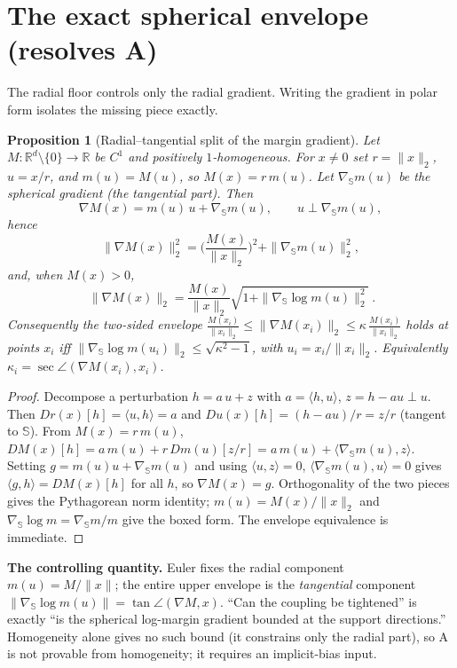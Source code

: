 \documentclass[11pt]{article}
\newtheorem{proposition}{Proposition}
\theoremstyle{definition}
\newcommand{\R}{\mathbb{R}}
\newcommand{\Sph}{\mathbb{S}}
\newcommand{\dd}{d}
\newcommand{\grad}{\nabla}
\begin{document}
\section{The exact spherical envelope (resolves A)}\label{sec:Aprime}
The radial floor controls only the radial gradient. Writing the gradient in polar
form isolates the missing piece exactly.

\begin{proposition}[Radial--tangential split of the margin gradient]\label{prop:Aprime}
Let $M:\R^{\dd}\setminus\{0\}\to\R$ be $C^1$ and positively $1$-homogeneous. For
$x\neq0$ set $r=\|x\|_2$, $u=x/r$, and $m(u)=M(u)$, so $M(x)=r\,m(u)$. Let
$\grad_{\Sph}m(u)$ be the spherical gradient (the tangential part). Then
\[
  \grad M(x)=m(u)\,u+\grad_{\Sph}m(u),\qquad u\perp\grad_{\Sph}m(u),
\]
hence
\[
  \|\grad M(x)\|_2^2=\Big(\frac{M(x)}{\|x\|_2}\Big)^2+\|\grad_{\Sph}m(u)\|_2^2,
\]
and, when $M(x)>0$,
\[
  \boxed{\ \|\grad M(x)\|_2=\frac{M(x)}{\|x\|_2}\sqrt{1+\|\grad_{\Sph}\log m(u)\|_2^2}\ }.
\]
Consequently the two-sided envelope
$\frac{M(x_i)}{\|x_i\|_2}\le\|\grad M(x_i)\|_2\le\kappa\,\frac{M(x_i)}{\|x_i\|_2}$
holds at points $x_i$ \emph{iff} $\|\grad_{\Sph}\log m(u_i)\|_2\le\sqrt{\kappa^2-1}$,
with $u_i=x_i/\|x_i\|_2$. Equivalently $\kappa_i=\sec\angle(\grad M(x_i),x_i)$.
\end{proposition}
\begin{proof}
Decompose a perturbation $h=a\,u+z$ with $a=\langle h,u\rangle$, $z=h-au\perp u$.
Then $Dr(x)[h]=\langle u,h\rangle=a$ and $Du(x)[h]=(h-au)/r=z/r$ (tangent to $\Sph$).
From $M(x)=r\,m(u)$,
$DM(x)[h]=a\,m(u)+r\,Dm(u)[z/r]=a\,m(u)+\langle\grad_{\Sph}m(u),z\rangle$. Setting
$g=m(u)u+\grad_{\Sph}m(u)$ and using $\langle u,z\rangle=0$,
$\langle\grad_{\Sph}m(u),u\rangle=0$ gives $\langle g,h\rangle=DM(x)[h]$ for all $h$,
so $\grad M(x)=g$. Orthogonality of the two pieces gives the Pythagorean norm
identity; $m(u)=M(x)/\|x\|_2$ and
$\grad_{\Sph}\log m=\grad_{\Sph}m/m$ give the boxed form. The envelope equivalence is
immediate.
\end{proof}

\noindent\textbf{The controlling quantity.} Euler fixes the radial component
$m(u)=M/\|x\|$; the entire upper envelope is the \emph{tangential} component
$\|\grad_{\Sph}\log m(u)\|=\tan\angle(\grad M,x)$. ``Can the coupling be tightened''
is exactly ``is the spherical log-margin gradient bounded at the support
directions.'' Homogeneity alone gives no such bound (it constrains only the radial
part), so A is not provable from homogeneity; it requires an implicit-bias input.
\end{document}
